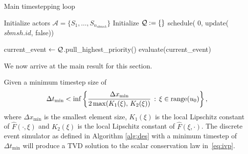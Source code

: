 \begin{algorithm}
\caption{Main timestepping loop}\label{alg:des}
\begin{algorithmic}
\State Initialize actors $\mathcal{A}= \{ S_1,\ldots, S_{n_{sbmsh}} \}$
\State Initialize $\mathcal{Q} := \{\}$
  \State schedule( 0, update($sbmsh.id$, false))
\EndFor

  \State current\_event $\gets \mathcal{Q}$.pull\_highest\_priority()
  \State evaluate(current\_event)
\EndWhile
\end{algorithmic}
\end{algorithm}

We now arrive at the main result for this section.
\begin{theorem}
\label{thm:des-tvd}
Given a minimum timestep size of
\begin{equation}
\Delta t_{\min} < \inf\left\{ \frac{\Delta x_{\min}}{2 \max(K_1(\xi),\,K_2(\xi))}\, : \, \xi \in \operatorname{range}(u_0) \right\},
\label{eq:dt-min}
\end{equation}
where $\Delta x_{\min}$ is the smallest element size, $K_1(\xi)$ is the local Lipschitz constant of $\hat{F}(\cdot,\xi)$ and $K_2(\xi)$ is the local Lipschitz constant of $\hat{F}(\xi,\cdot)$. The discrete event simulator as defined in Algorithm \ref{alg:des} with a minimum timestep of $\Delta t_{\min}$ will produce a TVD solution to the scalar conservation law in~\eqref{eq:ivp}.
\end{theorem}

